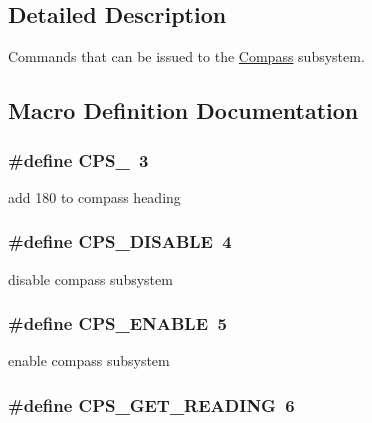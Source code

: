 \subsection{Detailed Description}
Commands that can be issued to the \hyperlink{classCompass}{Compass} subsystem. 

\subsection{Macro Definition Documentation}
\hypertarget{group__compass__commands_gafb06fe5e8531750fd730129beb1c85a9}{
\subsubsection[{C\-P\-S\-\_\-180}]{\setlength{\rightskip}{0pt plus 5cm}\#define C\-P\-S\-\_~3}}\label{group__compass__commands_gafb06fe5e8531750fd730129beb1c85a9}
add 180 to compass heading \hypertarget{group__compass__commands_gacc391ac5638a636771f016cfa1991d4d}{
\subsubsection[{C\-P\-S\-\_\-\-D\-I\-S\-A\-B\-L\-E}]{\setlength{\rightskip}{0pt plus 5cm}\#define C\-P\-S\-\_\-\-D\-I\-S\-A\-B\-L\-E~4}}\label{group__compass__commands_gacc391ac5638a636771f016cfa1991d4d}
disable compass subsystem \hypertarget{group__compass__commands_ga7991975b6f6c2c5c731bafe810ebcab8}{
\subsubsection[{C\-P\-S\-\_\-\-E\-N\-A\-B\-L\-E}]{\setlength{\rightskip}{0pt plus 5cm}\#define C\-P\-S\-\_\-\-E\-N\-A\-B\-L\-E~5}}\label{group__compass__commands_ga7991975b6f6c2c5c731bafe810ebcab8}
enable compass subsystem \hypertarget{group__compass__commands_ga5804a250179671cacf4c9b1b4572d8de}{
\subsubsection[{C\-P\-S\-\_\-\-G\-E\-T\-\_\-\-R\-E\-A\-D\-I\-N\-G}]{\setlength{\rightskip}{0pt plus 5cm}\#define C\-P\-S\-\_\-\-G\-E\-T\-\_\-\-R\-E\-A\-D\-I\-N\-G~6}}\label{group__compass__commands_ga5804a250179671cacf4c9b1b4572d8de}
